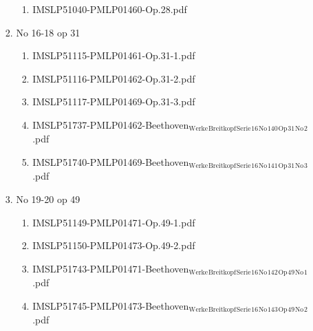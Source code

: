 \documentclass[11pt]{article}
\begin{document}
\begin{enumerate}
\begin{enumerate}
\begin{enumerate}
\begin{enumerate}
\item IMSLP51040-PMLP01460-Op.28.pdf
\label{sec-1-1-1-1-44-9-6-8-55-2}
\end{enumerate}

\item No 16-18 op 31
\label{sec-1-1-1-1-44-9-6-8-56}
\begin{enumerate}
\item IMSLP51115-PMLP01461-Op.31-1.pdf
\label{sec-1-1-1-1-44-9-6-8-56-1}

\item IMSLP51116-PMLP01462-Op.31-2.pdf
\label{sec-1-1-1-1-44-9-6-8-56-2}

\item IMSLP51117-PMLP01469-Op.31-3.pdf
\label{sec-1-1-1-1-44-9-6-8-56-3}

\item IMSLP51737-PMLP01462-Beethoven$_{\text{Werke}}$$_{\text{Breitkopf}}$$_{\text{Serie}}$$_{\text{16}}$$_{\text{No}}$$_{\text{140}}$$_{\text{Op}}$$_{\text{31}}$$_{\text{No}}$$_{\text{2}}$.pdf
\label{sec-1-1-1-1-44-9-6-8-56-4}

\item IMSLP51740-PMLP01469-Beethoven$_{\text{Werke}}$$_{\text{Breitkopf}}$$_{\text{Serie}}$$_{\text{16}}$$_{\text{No}}$$_{\text{141}}$$_{\text{Op}}$$_{\text{31}}$$_{\text{No}}$$_{\text{3}}$.pdf
\label{sec-1-1-1-1-44-9-6-8-56-5}
\end{enumerate}

\item No 19-20 op 49
\label{sec-1-1-1-1-44-9-6-8-57}
\begin{enumerate}
\item IMSLP51149-PMLP01471-Op.49-1.pdf
\label{sec-1-1-1-1-44-9-6-8-57-1}

\item IMSLP51150-PMLP01473-Op.49-2.pdf
\label{sec-1-1-1-1-44-9-6-8-57-2}

\item IMSLP51743-PMLP01471-Beethoven$_{\text{Werke}}$$_{\text{Breitkopf}}$$_{\text{Serie}}$$_{\text{16}}$$_{\text{No}}$$_{\text{142}}$$_{\text{Op}}$$_{\text{49}}$$_{\text{No}}$$_{\text{1}}$.pdf
\label{sec-1-1-1-1-44-9-6-8-57-3}

\item IMSLP51745-PMLP01473-Beethoven$_{\text{Werke}}$$_{\text{Breitkopf}}$$_{\text{Serie}}$$_{\text{16}}$$_{\text{No}}$$_{\text{143}}$$_{\text{Op}}$$_{\text{49}}$$_{\text{No}}$$_{\text{2}}$.pdf
\label{sec-1-1-1-1-44-9-6-8-57-4}
\end{enumerate}


\end{enumerate}
\end{enumerate}
\end{enumerate}
\end{document}
